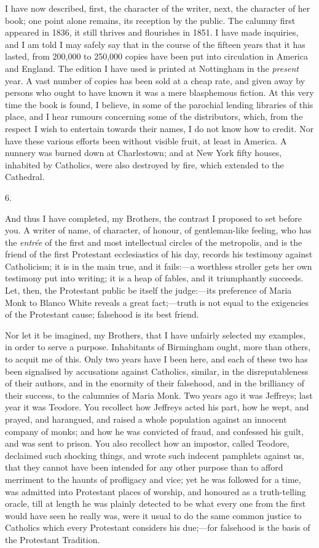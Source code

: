 I have now described, first, the character of the
writer, next, the character of her book; one point alone
remains, its reception by the public. The calumny first
appeared in 1836, it still thrives and flourishes in
1851. I have made inquiries, and I am told I may safely
say that in the course of the fifteen years that it has
lasted, from 200,000 to 250,000 copies have been put into
circulation in America and England. The edition I have
used is printed at Nottingham in the \emph{present}
year. A vast number of copies has been sold at a cheap
rate, and given away by persons who ought to have known
it was a mere blasphemous fiction. At this very time the
book is found, I believe, in some of the parochial
lending libraries of this place, and I hear rumours
concerning some of the distributors, which, from the
respect I wish to entertain towards their names, I do not
know how to credit. Nor have these various efforts been
without visible fruit, at least in America. A nunnery was
burned down at Charlestown; and at New York fifty houses,
inhabited by Catholics, were also destroyed by fire,
which extended to the Cathedral.

6.

And thus I have completed, my Brothers, the contrast I
proposed to set before you. A writer of name, of
character, of honour, of gentleman-like feeling, who has
the \emph{entrée} of the first and most intellectual circles of
the metropolis, and is the friend of the first Protestant
ecclesiastics of his day, records his testimony against
Catholicism; it is in the main true, and it fails:—a
worthless stroller gets her own testimony put into
writing; it is a heap of fables, and it triumphantly
succeeds. Let, then, the Protestant public be itself the
judge:—its preference of Maria Monk to Blanco White
reveals a great fact;—truth is not equal to the
exigencies of the Protestant cause; falsehood is its best
friend.

Nor let it be imagined, my Brothers, that I have
unfairly selected my examples, in order to serve a
purpose. Inhabitants of Birmingham ought, more than
others, to acquit me of this. Only two years have I been
here, and each of these two has been signalised by
accusations against Catholics, similar, in the
disreputableness of their authors, and in the enormity of
their falsehood, and in the brilliancy of their success,
to the calumnies of Maria Monk. Two years ago it was
Jeffreys; last year it was Teodore. You recollect how
Jeffreys acted his part, how he wept, and prayed, and
harangued, and raised a whole population against an
innocent company of monks; and how he was convicted of
fraud, and confessed his guilt, and was sent to prison.
You also recollect how an impostor, called Teodore,
declaimed such shocking things, and wrote such indecent
pamphlets against us, that they cannot have been intended
for any other purpose than to afford merriment to the
haunts of profligacy and vice; yet he was followed for a
time, was admitted into Protestant places of worship, and
honoured as a truth-telling oracle, till at length he was
plainly detected to be what every one from the first
would have seen he really was, were it usual to do the
same common justice to Catholics which every Protestant
considers his due;—for falsehood is the basis of the
Protestant Tradition.

